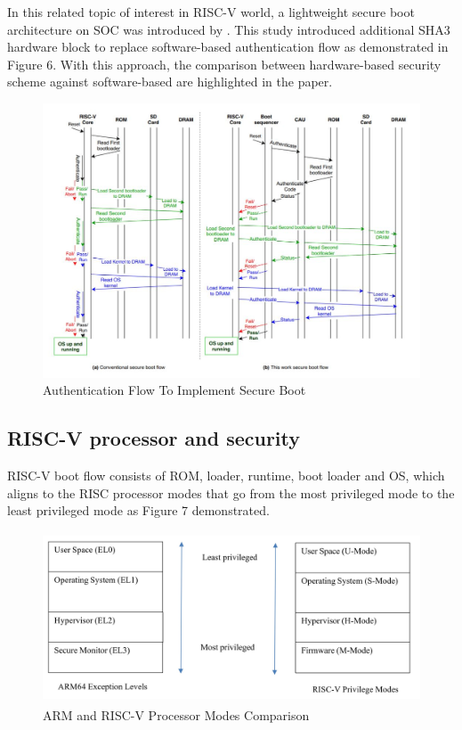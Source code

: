\documentclass[review]{elsarticle}
\begin{document}
In this related topic of interest in RISC-V world, a lightweight secure boot architecture on SOC was
introduced by \cite{R5:12}. This study
introduced additional SHA3 hardware block to replace software-based authentication flow as
demonstrated in Figure 6. With this approach, the comparison between hardware-based security
scheme against software-based are highlighted in the paper.

\begin{figure}[H]
	\includegraphics[width=1\textwidth]{figs/AuthenticationFlowToImplementSecureBoot.JPG}
	\caption{Authentication Flow To Implement Secure Boot \cite{R5:12}}
\end{figure}


\subsection{ RISC-V processor and security}
RISC-V boot flow consists of ROM, loader, runtime, boot loader and OS, which aligns to the RISC processor modes that go from the most privileged mode to the least privileged mode as Figure 7 demonstrated. 

\begin{figure}[H]
	\centering
	\includegraphics[width=1\textwidth,height=2in]{figs/ArmAndRiscVProcessorModesComparison.JPG}
	\caption{ARM and RISC-V Processor Modes Comparison}
\end{figure}
\end{document}
